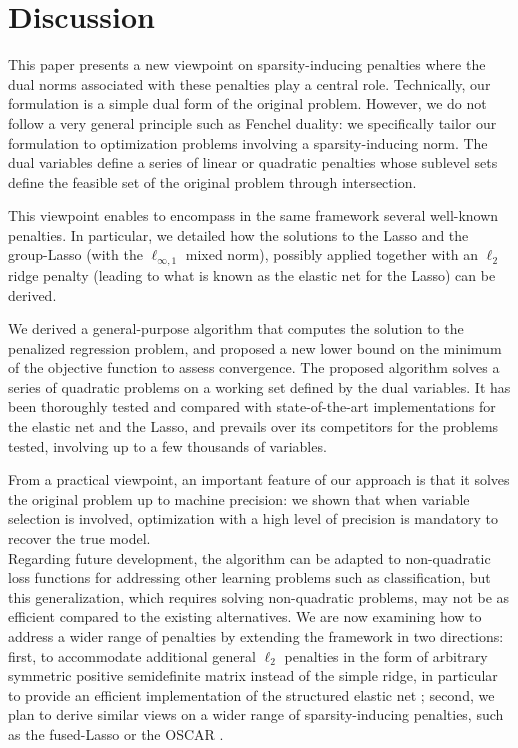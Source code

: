 \section{Discussion}


This paper presents a new viewpoint on sparsity-inducing penalties
where the dual norms associated with these penalties play a central role. 
Technically, our formulation is a simple dual form of the original problem. 
However, we do not follow a very general principle such as Fenchel duality: 
we specifically tailor our formulation to optimization problems involving a 
sparsity-inducing norm.
The dual variables define a series of linear or quadratic penalties whose 
sublevel sets define the feasible set of the original problem through
intersection.

This  viewpoint  enables  to  encompass in the same framework  several
well-known penalties. In particular, we detailed how the solutions to the Lasso and the
group-Lasso (with the $\ell_{\infty,1}$  mixed norm), possibly applied
together with an  $\ell_2$ ridge penalty (leading to what  is known as
the elastic net for the Lasso) can be derived. 

We derived a  general-purpose algorithm that computes the solution to
the penalized regression problem,  and proposed a new lower
bound  on the  minimum  of  the objective  function to
assess convergence.  The proposed  algorithm solves a series of
quadratic  problems on a working set defined  by the dual  variables.   
It has  been
thoroughly tested  and compared with  state-of-the-art implementations
for the elastic net and the Lasso, and prevails over its competitors for 
the problems tested, involving  up to a few thousands of variables.

From a  practical viewpoint, an  important feature of our  approach is
that it solves the original problem  up to machine precision: we shown
that when  variable selection  is involved,  optimization with  a high
level of precision is mandatory to recover the true model.
\\

Regarding  future  development,  the   algorithm  can  be  adapted  to
non-quadratic loss  functions for  addressing other  learning problems
such  as  classification,  but  this  generalization,  which  requires
solving non-quadratic  problems, may not  be as efficient  compared to
the  existing alternatives.   We are  now examining  how to  address a
wider range of penalties by extending the framework in two directions:
first,  to accommodate  additional general  $\ell_2$ penalties  in the
form of  arbitrary symmetric  positive semidefinite matrix  instead of
the simple ridge, in particular to provide an efficient implementation
of the  structured elastic  net \citep{2010_AOS_Slawski} ;  second, we
plan to  derive similar  views on a  wider range  of sparsity-inducing
penalties, such as the fused-Lasso or the OSCAR \citep{Bondell08}.
